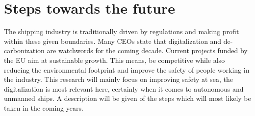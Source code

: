 \chapter{Steps towards the future}
\label{sec:future}
The shipping industry is traditionally driven by regulations and making profit within these given boundaries. Many CEOs state that digitalization and de-carbonization are watchwords for the coming decade.
Current projects funded by the EU aim at sustainable growth. This means, be competitive while also reducing the environmental footprint and improve the safety of people working in the industry. \cite{Eriksen2017} \cite{EU2017}
This research will mainly focus on improving safety at sea, the digitalization is most relevant here, certainly when it comes to autonomous and unmanned ships. A description will be given of the steps which will most likely be taken in the coming years.


